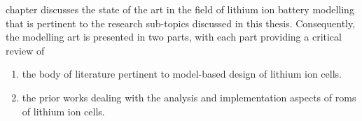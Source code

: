 
 chapter discusses the state of the  art in the field of lithium ion battery
modelling that is pertinent to the research sub-topics discussed in this thesis.
Consequently,  the modelling  art  is presented  in two  parts,  with each  part
providing a critical review of
\begin{enumerate}[topsep=0pt, before={\vspace*{-0.25\baselineskip}}]
    \item the body of literature pertinent to model-based design of lithium ion cells.
    \item the prior works dealing with the analysis and implementation aspects of \glspl{rom} of lithium ion cells.
\end{enumerate}

